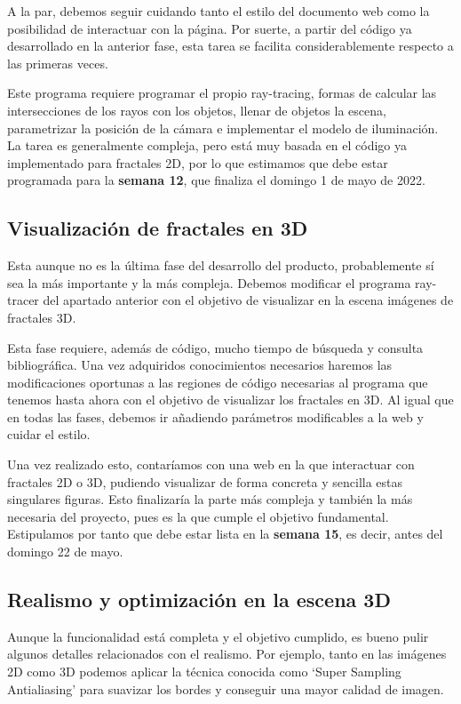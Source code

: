 A la par, debemos seguir cuidando tanto el estilo del documento web como la posibilidad de interactuar con la página. Por suerte, a partir del código ya desarrollado en la anterior fase, esta tarea se facilita considerablemente respecto a las primeras veces.

Este programa requiere programar el propio ray-tracing, formas de calcular las intersecciones de los rayos con los objetos, llenar de objetos la escena, parametrizar la posición de la cámara e implementar el modelo de iluminación. La tarea es generalmente compleja, pero está muy basada en el código ya implementado para fractales 2D, por lo que estimamos que debe estar programada para la \textbf{semana 12}, que finaliza el domingo 1 de mayo de 2022.

\subsection{Visualización de fractales en 3D}

Esta aunque no es la última fase del desarrollo del producto, probablemente sí sea la más importante y la más compleja. Debemos modificar el programa ray-tracer del apartado anterior con el objetivo de visualizar en la escena imágenes de fractales 3D.

Esta fase requiere, además de código, mucho tiempo de búsqueda y consulta bibliográfica. Una vez adquiridos conocimientos necesarios haremos las modificaciones oportunas a las regiones de código necesarias al programa que tenemos hasta ahora con el objetivo de visualizar los fractales en 3D.
Al igual que en todas las fases, debemos ir añadiendo parámetros modificables a la web y cuidar el estilo.

Una vez realizado esto, contaríamos con una web en la que interactuar con fractales 2D o 3D, pudiendo visualizar de forma concreta y sencilla estas singulares figuras. Esto finalizaría la parte más compleja y también la más necesaria del proyecto, pues es la que cumple el objetivo fundamental. Estipulamos por tanto que debe estar lista en la \textbf{semana 15}, es decir, antes del domingo 22 de mayo.

\subsection{Realismo y optimización en la escena 3D}

Aunque la funcionalidad está completa y el objetivo cumplido, es bueno pulir algunos detalles relacionados con el realismo. Por ejemplo, tanto en las imágenes 2D como 3D podemos aplicar la técnica conocida como `Super Sampling Antialiasing' para suavizar los bordes y conseguir una mayor calidad de imagen.

